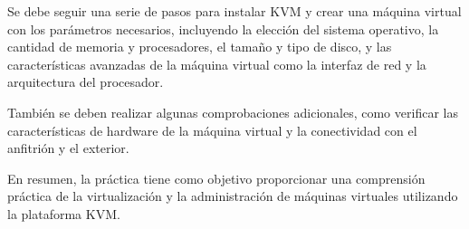 Se debe seguir una serie de pasos para instalar KVM y crear una máquina virtual con los parámetros necesarios, incluyendo la elección del sistema operativo, la cantidad de memoria y procesadores, el tamaño y tipo de disco, y las características avanzadas de la máquina virtual como la interfaz de red y la arquitectura del procesador. 

También se deben realizar algunas comprobaciones adicionales, como verificar las características de hardware de la máquina virtual y la conectividad con el anfitrión y el exterior. 

En resumen, la práctica tiene como objetivo proporcionar una comprensión práctica de la virtualización y la administración de máquinas virtuales utilizando la plataforma KVM.